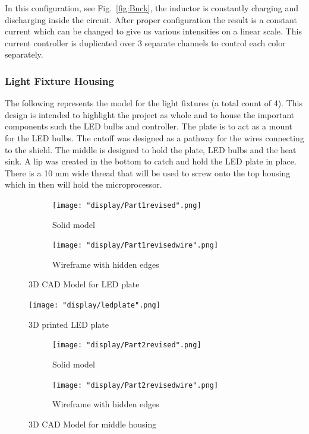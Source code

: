 \documentclass[12pt,a4paper]{report}
\begin{document}
In this configuration, see Fig.~\ref{fig:Buck}, the inductor is constantly charging and discharging inside the circuit. After proper configuration the result is a constant current which can be changed to give us various intensities on a linear scale. This current controller is duplicated over 3 separate channels to control each color separately.

\subsubsection{Light Fixture Housing}
The following represents the model for the light fixtures (a total count of 4). This design is intended to highlight the project as whole and to house the important components such the LED bulbs and controller. The plate is to act as a mount for the LED bulbs. The cutoff was designed as a pathway for the wires connecting to the shield. The middle is designed to hold the plate, LED bulbs and the heat sink. A lip was created in the bottom to catch and hold the LED plate in place. There is a 10 mm wide thread that will be used to screw onto the top housing which in then will hold the microprocessor.
\begin{figure}[H]
\centering
\begin{subfigure}{.5\textwidth}
  \centering
  \texttt{[image: "display/Part1revised".png]}
  \caption{Solid model}
  \label{fig:sub1}
\end{subfigure}%
\begin{subfigure}{.5\textwidth}
  \centering
  \texttt{[image: "display/Part1revisedwire".png]}
  \caption{Wireframe with hidden edges}
  \label{fig:sub2}
\end{subfigure}
\caption{3D CAD Model for LED plate}
\label{fig:test}
\end{figure}
\begin{figure}[H]
	\centering
	\texttt{[image: "display/ledplate".png]}\par			
	\vspace{0.1cm}
	\caption{3D printed LED plate}
\end{figure}
\begin{figure}[H]
\centering
\begin{subfigure}{.5\textwidth}
  \centering
  \texttt{[image: "display/Part2revised".png]}
  \caption{Solid model}
  \label{fig:sub1}
\end{subfigure}%
\begin{subfigure}{.5\textwidth}
  \centering
  \texttt{[image: "display/Part2revisedwire".png]}
  \caption{Wireframe with hidden edges}
  \label{fig:sub2}
\end{subfigure}
\caption{3D CAD Model for middle housing}
\label{fig:test}
\end{figure}
\end{document}
